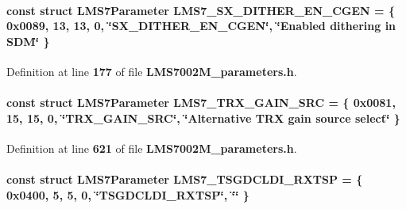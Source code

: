 \paragraph[{L\+M\+S7\+\_\+\+S\+X\+\_\+\+D\+I\+T\+H\+E\+R\+\_\+\+E\+N\+\_\+\+C\+G\+EN}]{\setlength{\rightskip}{0pt plus 5cm}const struct {\bf L\+M\+S7\+Parameter} L\+M\+S7\+\_\+\+S\+X\+\_\+\+D\+I\+T\+H\+E\+R\+\_\+\+E\+N\+\_\+\+C\+G\+EN = \{ 0x0089, 13, 13, 0, \char`\"{}\+S\+X\+\_\+\+D\+I\+T\+H\+E\+R\+\_\+\+E\+N\+\_\+\+C\+G\+E\+N\char`\"{}, \char`\"{}\+Enabled dithering in S\+D\+M\char`\"{} \}\hspace{0.3cm}{\ttfamily [static]}}\label{LMS7002M__parameters_8h_adcc06ec31e85062f6de97610d9841f9b}


Definition at line {\bf 177} of file {\bf L\+M\+S7002\+M\+\_\+parameters.\+h}.

\paragraph[{L\+M\+S7\+\_\+\+T\+R\+X\+\_\+\+G\+A\+I\+N\+\_\+\+S\+RC}]{\setlength{\rightskip}{0pt plus 5cm}const struct {\bf L\+M\+S7\+Parameter} L\+M\+S7\+\_\+\+T\+R\+X\+\_\+\+G\+A\+I\+N\+\_\+\+S\+RC = \{ 0x0081, 15, 15, 0, \char`\"{}\+T\+R\+X\+\_\+\+G\+A\+I\+N\+\_\+\+S\+R\+C\char`\"{}, \char`\"{}\+Alternative T\+R\+X gain source select\char`\"{} \}\hspace{0.3cm}{\ttfamily [static]}}\label{LMS7002M__parameters_8h_ad7e3a59f3604785a46a911987626c856}


Definition at line {\bf 621} of file {\bf L\+M\+S7002\+M\+\_\+parameters.\+h}.

\paragraph[{L\+M\+S7\+\_\+\+T\+S\+G\+D\+C\+L\+D\+I\+\_\+\+R\+X\+T\+SP}]{\setlength{\rightskip}{0pt plus 5cm}const struct {\bf L\+M\+S7\+Parameter} L\+M\+S7\+\_\+\+T\+S\+G\+D\+C\+L\+D\+I\+\_\+\+R\+X\+T\+SP = \{ 0x0400, 5, 5, 0, \char`\"{}\+T\+S\+G\+D\+C\+L\+D\+I\+\_\+\+R\+X\+T\+S\+P\char`\"{}, \char`\"{}\char`\"{} \}\hspace{0.3cm}{\ttfamily [static]}}\label{LMS7002M__parameters_8h_a2137565a7e8fcd8c38c8088c729b29b8}


